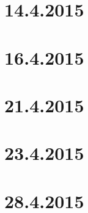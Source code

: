 \documentclass[a4paper,12pt]{scrartcl}
\begin{document}
\section*{14.4.2015}

\section*{16.4.2015}

\section*{21.4.2015}

\section*{23.4.2015}

\section*{28.4.2015}

\end{document}
